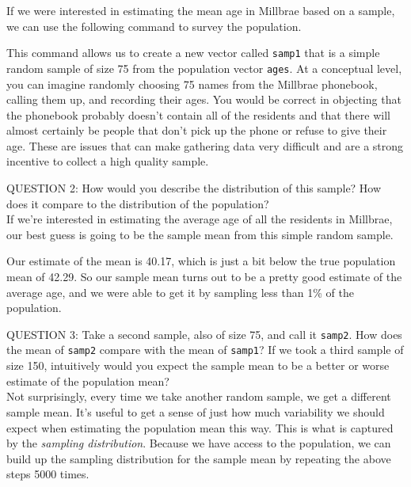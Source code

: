 \documentclass[11pt]{article}
\begin{document}
If we were interested in estimating the mean age in Millbrae based on a sample, we can use the following command to survey the population.


This command allows us to create a new vector called \texttt{samp1} that is a simple random sample of size 75 from the population vector \texttt{ages}.  At a conceptual level, you can imagine randomly choosing 75 names from the Millbrae  phonebook, calling them up, and recording their ages.  You would be correct in objecting that the phonebook probably doesn't contain all of the residents and that there will almost certainly be people that don't pick up the phone or refuse to give their age.  These are issues that can make gathering data very difficult and are a strong incentive to collect a high quality sample.

QUESTION 2: How would you describe the distribution of this sample?   How does it compare to the distribution of the population?
\\


If we're interested in estimating the average age of all the residents in Millbrae, our best guess is going to be the sample mean from this simple random sample.


Our estimate of the mean is 40.17, which is just a bit below the true population mean of 42.29.  So our sample mean turns out to be a pretty good estimate of the average age, and we were able to get it by sampling less than 1\% of the population.

\bigskip
QUESTION 3: Take a second sample, also of size 75, and call it \texttt{samp2}.  How does the mean of \texttt{samp2} compare with the mean of \texttt{samp1}?  If we took a third sample of size 150, intuitively would you expect the sample mean to be a better or worse estimate of the population mean?
\\

Not surprisingly, every time we take another random sample, we get a different sample mean.  It's useful to get a sense of just how much variability we should expect when estimating the population mean this way.  This is what is captured by the \emph{sampling distribution}.  Because we have access to the population, we can build up the sampling distribution for the sample mean by repeating the above steps 5000 times.

\end{document}
